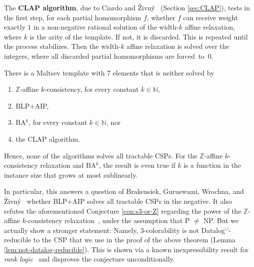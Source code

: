 \documentclass[a4paper,english, thm-restate]{lipics-v2021}
\newcommand{\bbN}{\mathbb{N}}
\newcommand{\bbZ}{\mathbb{Z}}
\begin{document}
	The \textbf{CLAP algorithm}, due to Ciardo and Živný~\cite{CiardoZivny2023CLAP} (Section \ref{sec:CLAP}),
	tests in the first step, for each partial homomorphism $f$,
	whether $f$ can receive weight exactly $1$ in a non-negative rational solution of the width-$k$ affine relaxation,
	where $k$ is the arity of the template.
	If not, it is discarded.
	This is repeated until the process stabilizes.
	Then the width-$k$ affine relaxation is solved over the integers,
	where all discarded partial homomorphisms are forced~to~$0$.
	
	
	
	\begin{theorem}
		\label{thm:mainResultInformal}
		There is a Maltsev template with $7$ elements that is neither solved by
		\begin{enumerate}
			\item $\bbZ$-affine $k$-consistency, for every constant $k \in \bbN$,
			\item BLP+AIP,
			\item BA$^k$, for every constant $k \in \bbN$, nor
			\item  the CLAP algorithm.
		\end{enumerate}
		Hence, none of the algorithms solves all tractable CSPs.
		For the $\bbZ$-affine $k$-consistency relaxation and BA$^k$, the result is even true if $k$ is a function in the instance size that grows at most sublinearly. 
	\end{theorem}	
	\noindent In particular, this answers a question of 
	Brakensiek, Guruswami, Wrochna, and Živný~\cite{BrakensiekGWZ2020} whether BLP+AIP solves all tractable CSPs in the negative.
	It also refutes the aforementioned Conjecture \ref{con:s3-or-Z} regarding the power of the $\bbZ$-affine $k$-consistency relaxation~\cite{DalmauOprsal2024}, under the assumption that P $\neq$ NP. 
	But we actually show a stronger statement: Namely, 3-colorability is not Datalog$^\cup$-reducible to the CSP that we use in the proof of the above theorem (Lemma \ref{lem:not-datalog-reducible}). This is shown via a known inexpressibility result for \emph{rank logic}~\cite{GradelPakusa19} and disproves the conjecture unconditionally.
	
\end{document}
